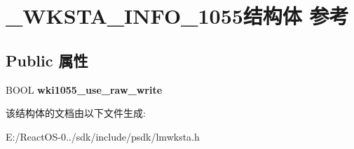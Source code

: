 \hypertarget{struct___w_k_s_t_a___i_n_f_o__1055}{}\section{\+\_\+\+W\+K\+S\+T\+A\+\_\+\+I\+N\+F\+O\+\_\+1055结构体 参考}
\label{struct___w_k_s_t_a___i_n_f_o__1055}
\subsection*{Public 属性}
\begin{DoxyCompactItemize}
\item 
\mbox{\label{struct___w_k_s_t_a___i_n_f_o__1055_aa953d33d4a7ed5ec2c21be811d8850b9}} 
B\+O\+OL {\bfseries wki1055\+\_\+use\+\_\+raw\+\_\+write}
\end{DoxyCompactItemize}


该结构体的文档由以下文件生成\+:\begin{DoxyCompactItemize}
\item 
E\+:/\+React\+O\+S-\/0../sdk/include/psdk/lmwksta.\+h\end{DoxyCompactItemize}
